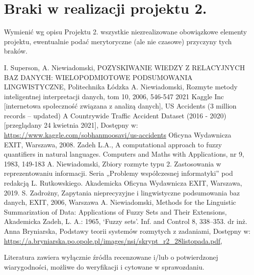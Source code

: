\documentclass{classrep}
\begin{document}
\section{Braki w realizacji projektu 2.}
Wymienić wg opisu Projektu 2. wszystkie niezrealizowane obowiązkowe elementy projektu, ewentualnie
podać merytoryczne (ale nie czasowe) przyczyny tych braków. 


\begin{thebibliography}{99}
 I. Superson, A. Niewiadomski, POZYSKIWANIE WIEDZY Z RELACYJNYCH BAZ DANYCH: WIELOPODMIOTOWE PODSUMOWANIA LINGWISTYCZNE, Politechnika Łódzka
 A. Niewiadomski, Rozmyte metody inteligentnej interpretacji danych, tom 10, 2006, 546-547
 2021 Kaggle Inc [internetowa społeczność związana z analizą danych], US Accidents (3 million records -- updated)
A Countrywide Traffic Accident Dataset (2016 - 2020) [przeglądany 24 kwietnia 2021], Dostępny w: \url{https://www.kaggle.com/sobhanmoosavi/us-accidents}
Oficyna Wydawnicza EXIT, Warszawa, 2008.
 Zadeh L.A., A computational approach to fuzzy quantifiers in natural languages. Computers and Maths with Applications, nr 9, 1983, 149-183
  A. Niewiadomski, Zbiory rozmyte typu 2. Zastosowania w reprezentowaniu informacji.  Seria „Problemy współczesnej informatyki” pod redakcją L. Rutkowskiego. Akademicka Oficyna Wydawnicza EXIT, Warszawa, 2019.
 S. Zadrożny, Zapytania nieprecyzyjne i lingwistyczne podsumowania baz danych, EXIT, 2006, Warszawa
 A. Niewiadomski, Methods for the Linguistic Summarization of Data: Applications of Fuzzy Sets and Their Extensions, Akademicka 
 Zadeh, L. A.: 1965, ‘Fuzzy sets’. Inf. and Control 8, 338–353.
 dr inż. Anna Bryniarska, Podstawy teorii systemów rozmytych z zadaniami, Dostępny w: \url{https://a.bryniarska.po.opole.pl/images/nsi/skrypt_r2_28listopada.pdf},
\end{thebibliography}

Literatura zawiera wyłącznie źródła recenzowane i/lub o potwierdzonej wiarygodności,
możliwe do weryfikacji i cytowane w sprawozdaniu. 
\end{document}
